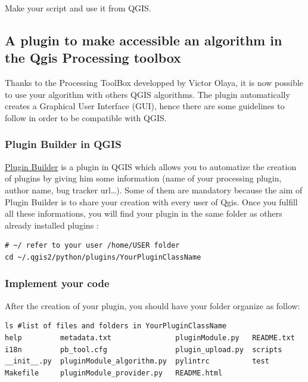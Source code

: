 \documentclass[a4paper,11pt,DIV=18]{scrartcl}
\begin{document}
\begin{work}
Make your script and use it from QGIS.
\end{work}

\subsection{A plugin to make accessible an algorithm in the Qgis Processing toolbox}
\label{sec:org537e83e}
Thanks to the Processing ToolBox developped by Victor Olaya, it is now
possible  to use  your  algorithm with  others  QGIS algorithms.   The
plugin automatically  creates a Graphical User  Interface (GUI), hence
there are  some guidelines to  follow in  order to be  compatible with
QGIS.

\subsubsection{Plugin Builder in QGIS}
\label{sec:org8b394db}
\href{http://g-sherman.github.io/Qgis-Plugin-Builder/}{Plugin Builder} is a plugin in  QGIS which allows you to automatize the
creation  of plugins  by giving  him  some information  (name of  your
processing plugin, author name, bug  tracker url\ldots{}). Some of them are
mandatory because the aim of Plugin  Builder is to share your creation
with every user of Qgis.  Once you fulfill all these informations, you
will find your  plugin in the same folder as  others already installed
plugins :

\begin{verbatim}
# ~/ refer to your user /home/USER folder
cd ~/.qgis2/python/plugins/YourPluginClassName
\end{verbatim}

\subsubsection{Implement your code}
\label{sec:org1e692d4}
After the creation of your plugin, you should have your folder organize as follow:

\begin{verbatim}
ls #list of files and folders in YourPluginClassName
help         metadata.txt               pluginModule.py   README.txt
i18n         pb_tool.cfg                plugin_upload.py  scripts
__init__.py  pluginModule_algorithm.py  pylintrc          test
Makefile     pluginModule_provider.py   README.html
\end{verbatim}
\end{document}
